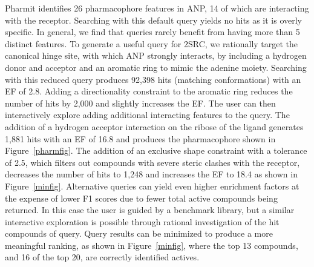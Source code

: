   Pharmit identifies 26 pharmacophore features in ANP, 14 of which are interacting with the receptor.  Searching with this default query yields no hits as it is overly specific.  In general, we find that queries rarely benefit from having more than 5 distinct features.
  To generate a useful query for 2SRC, we rationally target the canonical hinge site, with which ANP strongly interacts, by including a hydrogen donor and acceptor and an aromatic ring to mimic the adenine moiety.  Searching with this reduced query produces 92,398 hits (matching conformations) with an EF of 2.8.  Adding a directionality constraint to the aromatic ring reduces the number of hits by 2,000 and slightly increases the EF.  The user can then interactively explore adding additional interacting features to the query.  The addition of a hydrogen acceptor interaction on the ribose of the ligand generates 1,881 hits with an EF of 16.8 and produces the pharmacophore shown in Figure~\ref{pharmfig}.  The addition of an exclusive shape constraint with a tolerance of 2.5, which filters out compounds with severe steric clashes with the receptor, decreases the number of hits to 1,248 and increases the EF to 18.4 as shown in Figure~\ref{minfig}. Alternative queries can yield even higher enrichment factors at the expense of lower F1 scores due to fewer total active compounds being returned.  In this case the user is guided by a benchmark library, but a similar interactive exploration is possible through rational investigation of the hit compounds of query.
Query results can be minimized to produce a more meaningful ranking, as shown in Figure~\ref{minfig}, where the top 13 compounds, and 16 of the top 20, are correctly identified actives. 
  
